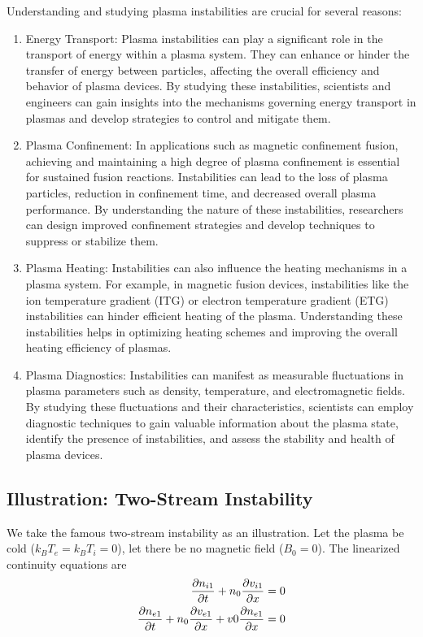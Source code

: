 Understanding and studying plasma instabilities are crucial for several reasons:
\begin{enumerate}
	\item Energy Transport: Plasma instabilities can play a significant role in the transport of energy within a plasma system. They can enhance or hinder the transfer of energy between particles, affecting the overall efficiency and behavior of plasma devices. By studying these instabilities, scientists and engineers can gain insights into the mechanisms governing energy transport in plasmas and develop strategies to control and mitigate them.
	\item Plasma Confinement: In applications such as magnetic confinement fusion, achieving and maintaining a high degree of plasma confinement is essential for sustained fusion reactions. Instabilities can lead to the loss of plasma particles, reduction in confinement time, and decreased overall plasma performance. By understanding the nature of these instabilities, researchers can design improved confinement strategies and develop techniques to suppress or stabilize them.
	\item Plasma Heating: Instabilities can also influence the heating mechanisms in a plasma system. For example, in magnetic fusion devices, instabilities like the ion temperature gradient (ITG) or electron temperature gradient (ETG) instabilities can hinder efficient heating of the plasma. Understanding these instabilities helps in optimizing heating schemes and improving the overall heating efficiency of plasmas.
	\item Plasma Diagnostics: Instabilities can manifest as measurable fluctuations in plasma parameters such as density, temperature, and electromagnetic fields. By studying these fluctuations and their characteristics, scientists can employ diagnostic techniques to gain valuable information about the plasma state, identify the presence of instabilities, and assess the stability and health of plasma devices.
\end{enumerate}

\subsection{Illustration: Two-Stream Instability} \label{sec:two-stream-instability}
We take the famous two-stream instability as an illustration. Let the plasma be cold ($k_BT_e = k_BT_i = 0$), let there be no magnetic field ($B_0=0$). The linearized continuity equations are
\begin{align}
	\pdv{n_{i1}}{t} + n_0\pdv{v_{i1}}{x}                     & = 0  \label{eq:two-stream-continuity1} \\
	\pdv{n_{e1}}{t} + n_0\pdv{v_{e1}}{x} + v0\pdv{n_{e1}}{x} & = 0 \label{eq:two-stream-continuity2}
\end{align}

